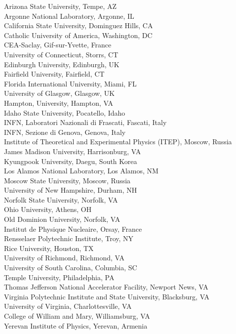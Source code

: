 \documentclass[12pt]{report}
\begin{document}
\noindent 
Arizona State University, Tempe, AZ\\
Argonne National Laboratory, Argonne, IL\\
California State University, Dominguez Hills, CA\\
Catholic University of America, Washington, DC\\
CEA-Saclay,  Gif-sur-Yvette, France\\
University of Connecticut, Storrs, CT\\
Edinburgh University, Edinburgh, UK\\
Fairfield University, Fairfield, CT\\
Florida International University, Miami, FL\\
University of Glasgow, Glasgow, UK\\
Hampton, University, Hampton, VA\\
Idaho State University, Pocatello, Idaho\\
INFN, Laboratori Nazionali di Frascati, Fascati, Italy\\
INFN, Sezione di Genova, Genova, Italy\\
Institute of Theoretical and Experimental Physics (ITEP), Moscow, Russia\\
James Madison University, Harrisonburg, VA\\
Kyungpook University, Daegu, South Korea\\
Los Alamos National Laboratory, Los Alamos, NM\\
Moscow State University, Moscow, Russia\\
University of New Hampshire, Durham, NH\\
Norfolk State University, Norfolk, VA\\
Ohio University, Athens, OH\\
Old Dominion University, Norfolk, VA\\
Institut de Physique Nucleaire, Orsay, France\\
Rensselaer Polytechnic Institute, Troy, NY\\
Rice University, Houston, TX\\
University of Richmond, Richmond, VA\\
University of South Carolina, Columbia, SC\\
Temple University, Philadelphia, PA\\
Thomas Jefferson National Accelerator Facility, Newport News, VA\\
Virginia Polytechnic Institute and State University, Blacksburg, VA\\
University of Virginia, Charlottesville, VA\\
College of William and Mary, Williamsburg, VA\\
Yerevan Institute of Physics, Yerevan, Armenia\\
\end{document}
